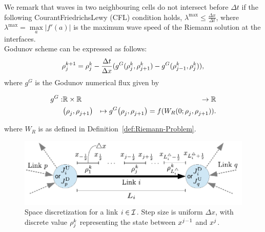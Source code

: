 We remark that waves in two neighbouring cells do not intersect before $\Delta t$ if the following Courant\textendash{}Friedrichs\textendash{}Lewy (CFL) condition holds, $\lambda^{\max}\le\frac{\Delta x}{\Delta t}$, where $\lambda^{\max}=\underset{a}{\max}|f'\left(a\right)|$ is the maximum wave speed of the Riemann solution at the interfaces.\\
Godunov scheme can be expressed as follows:
\begin{equation}
\rho_{j}^{k+1}=\rho_{j}^{k}-\frac{\Delta t}{\Delta x}(g^{G}(\rho_{j}^{k},\rho_{j+1}^{k})-g^{G}(\rho_{j-1}^{k},\rho_{j}^{k})),\label{eq:godscheme}
\end{equation}
where $g^{G}$ is the Godunov numerical flux given by

\begin{eqnarray*}
\god: & \mathbb{R}\times\mathbb{R} & \rightarrow\mathbb{R}\\
 & \left(\discrete{\xind}{},\discrete{\xind+1}{}\right) & \mapsto\god\left(\discrete{\xind}{},\discrete{\xind+1}{}\right)=f(W_{R}(0;\discrete{\xind}{},\discrete{\xind+1}{})).
\end{eqnarray*}

where $W_{R}$ is as defined in Definition~\ref{def:Riemann-Problem}.



\begin{figure}
\begin{centering}
\includegraphics[width=0.6\columnwidth]{previous-articles/adjoint/figs-gen/dx}
\par\end{centering}

\caption[Space discretization for a link $\link\in\links$.]{Space discretization for a link $\link\in\links$. Step size is uniform
$\Delta x$, with discrete value $\rho_{j}^{k}$ representing
the state between $x^{j-1}$ and $x^{j}$.\label{fig:Space-discretization-for}}


\end{figure}



